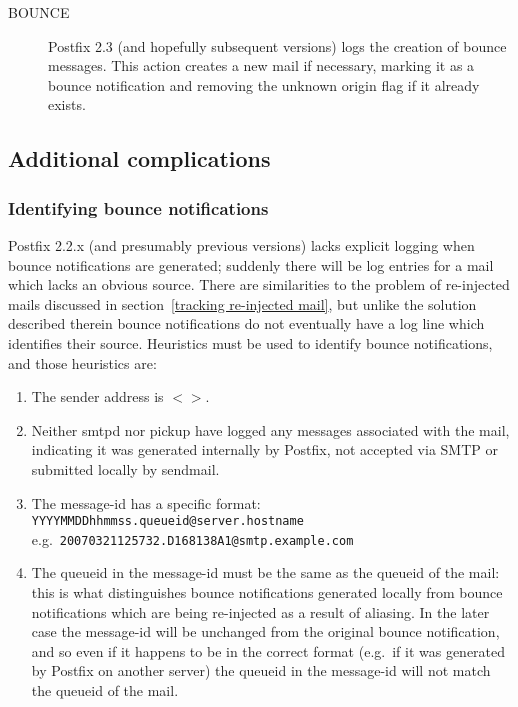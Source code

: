 \documentclass[a4paper,12pt,draft]{article}
\begin{document}
\begin{description}
    \item [BOUNCE] Postfix 2.3 (and hopefully subsequent versions) logs the
        creation of bounce messages.  This action creates a new mail if
        necessary, marking it as a bounce notification and removing the
        unknown origin flag if it already exists.

\end{description}

\subsection{Additional complications}

\label{additional complications}

\subsubsection{Identifying bounce notifications}

\label{identifying-bounce-notifications}

Postfix 2.2.x (and presumably previous versions) lacks explicit logging
when bounce notifications are generated; suddenly there will be log entries
for a mail which lacks an obvious source.  There are similarities to the
problem of re-injected mails discussed in
section~\ref{tracking re-injected mail}, but unlike the solution described
therein bounce notifications do not eventually have a log line which
identifies their source.  Heuristics must be used to identify bounce
notifications, and those heuristics are:

\begin{enumerate}

    \item The sender address is $<>$.

    \item Neither smtpd nor pickup have logged any messages associated with
        the mail, indicating it was generated internally by Postfix, not
        accepted via SMTP or submitted locally by sendmail.

    \item The message-id has a specific format: \newline
        \texttt{YYYYMMDDhhmmss.queueid@server.hostname} \newline
        e.g.\ \texttt{20070321125732.D168138A1@smtp.example.com}

    \item The queueid in the message-id must be the same as the queueid of
        the mail: this is what distinguishes bounce notifications generated
        locally from bounce notifications which are being re-injected as a
        result of aliasing.  In the later case the message-id will be
        unchanged from the original bounce notification, and so even if it
        happens to be in the correct format (e.g.\ if it was generated by
        Postfix on another server) the queueid in the message-id will not
        match the queueid of the mail.

\end{enumerate}
\end{document}
